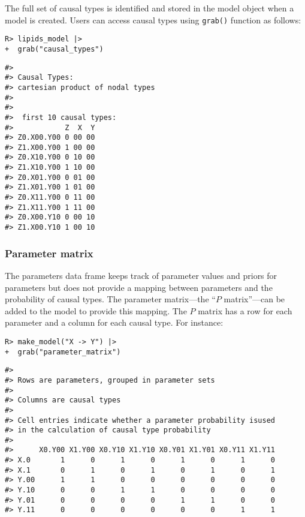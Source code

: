 \documentclass[
  11pt,
  article]{jss}
\begin{document}
The full set of causal types is identified and stored in the model
object when a model is created. Users can access causal types using
\texttt{grab()} function as follows:

\begin{verbatim}
R> lipids_model |> 
+  grab("causal_types")
\end{verbatim}

\begin{verbatim}
#> 
#> Causal Types: 
#> cartesian product of nodal types
#> 
#> 
#>  first 10 causal types: 
#>            Z  X  Y
#> Z0.X00.Y00 0 00 00
#> Z1.X00.Y00 1 00 00
#> Z0.X10.Y00 0 10 00
#> Z1.X10.Y00 1 10 00
#> Z0.X01.Y00 0 01 00
#> Z1.X01.Y00 1 01 00
#> Z0.X11.Y00 0 11 00
#> Z1.X11.Y00 1 11 00
#> Z0.X00.Y10 0 00 10
#> Z1.X00.Y10 1 00 10
\end{verbatim}

\hypertarget{parameter-matrix}{%
\subsubsection{Parameter matrix}\label{parameter-matrix}}

The parameters data frame keeps track of parameter values and priors for
parameters but does not provide a mapping between parameters and the
probability of causal types. The parameter matrix---the ``\(P\)
matrix''---can be added to the model to provide this mapping. The \(P\)
matrix has a row for each parameter and a column for each causal type.
For instance:

\begin{verbatim}
R> make_model("X -> Y") |> 
+  grab("parameter_matrix")
\end{verbatim}

\begin{verbatim}
#> 
#> Rows are parameters, grouped in parameter sets
#> 
#> Columns are causal types
#> 
#> Cell entries indicate whether a parameter probability isused
#> in the calculation of causal type probability
#> 
#>      X0.Y00 X1.Y00 X0.Y10 X1.Y10 X0.Y01 X1.Y01 X0.Y11 X1.Y11
#> X.0       1      0      1      0      1      0      1      0
#> X.1       0      1      0      1      0      1      0      1
#> Y.00      1      1      0      0      0      0      0      0
#> Y.10      0      0      1      1      0      0      0      0
#> Y.01      0      0      0      0      1      1      0      0
#> Y.11      0      0      0      0      0      0      1      1
\end{verbatim}
\end{document}

